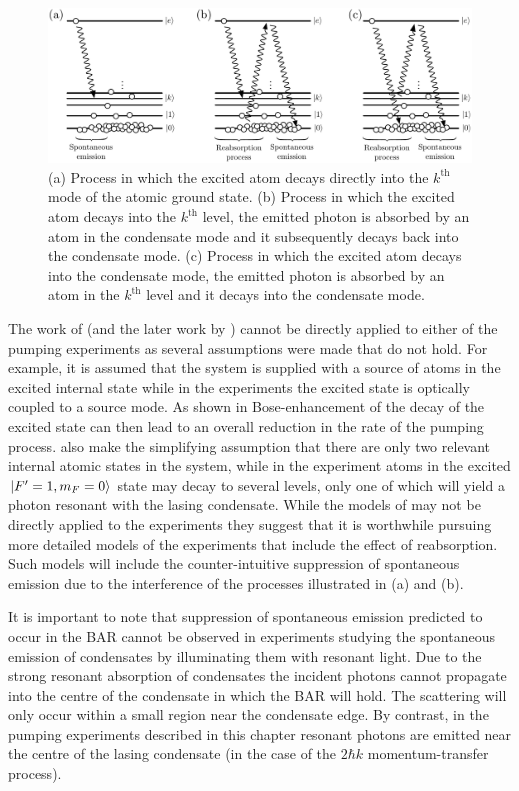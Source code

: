 \begin{figure}
    \centering
    \includegraphics[width=14cm]{BARProcesses}
    \caption{(a) Process in which the excited atom decays directly into the $k^\text{th}$ mode of the atomic ground state. (b) Process in which the excited atom decays into the $k^\text{th}$ level, the emitted photon is absorbed by an atom in the condensate mode and it subsequently decays back into the condensate mode. (c) Process in which the excited atom decays into the condensate mode, the emitted photon is absorbed by an atom in the $k^\text{th}$ level and it decays into the condensate mode.}
    \label{OpticalPumping:BARProcesses}
\end{figure}

The work of \citet{Cirac:1996rr} (and the later work by \citet{Floegel:2001}) cannot be directly applied to either of the pumping experiments as several assumptions were made that do not hold.  For example, it is assumed that the system is supplied with a source of atoms in the excited internal state while in the experiments the excited state is optically coupled to a source mode.  As shown in  Bose-enhancement of the decay of the excited state can then lead to an overall reduction in the rate of the pumping process.  \citeauthor{Cirac:1996rr} also make the simplifying assumption that there are only two relevant internal atomic states in the system, while in the experiment atoms in the excited ${\left|F'=1, m_F=0\right>}$ state may decay to several levels, only one of which will yield a photon resonant with the lasing condensate.  While the models of \citep{Cirac:1996rr,Floegel:2001} may not be directly applied to the experiments they suggest that it is worthwhile pursuing more detailed models of the experiments that include the effect of reabsorption.  Such models will include the counter-intuitive suppression of spontaneous emission due to the interference of the processes illustrated in (a) and (b).

It is important to note that suppression of spontaneous emission predicted to occur in the BAR cannot be observed in experiments studying the spontaneous emission of condensates by illuminating them with resonant light.  Due to the strong resonant absorption of condensates the incident photons cannot propagate into the centre of the condensate in which the BAR will hold.  The scattering will only occur within a small region near the condensate edge.  By contrast, in the pumping experiments described in this chapter resonant photons are emitted near the centre of the lasing condensate (in the case of the $2 \hbar k$ momentum-transfer process).

